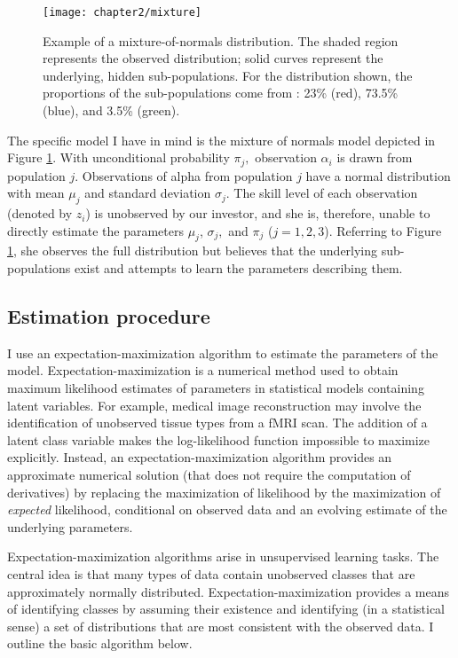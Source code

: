 		\begin{figure}[t]
			\small
			\centering
			\texttt{[image: chapter2/mixture]}
			\captionsetup{skip=-20pt, font=footnotesize, justification=justified, width=\textwidth}
			\caption[Example of a mixture-of-normals distribution]{Example of a mixture-of-normals distribution. The shaded region represents the observed distribution; solid curves represent the underlying, hidden sub-populations. For the distribution shown, the proportions of the sub-populations come from \citet{Barras2010}: 23\% (red), 73.5\% (blue), and 3.5\% (green).}
			\label{fig:mixture}
		\end{figure}

		The specific model I have in mind is the mixture of normals model depicted in Figure \ref{fig:mixture}. With unconditional probability $\pi_j,$ observation $\alpha_i$ is drawn from population $j$. Observations of alpha from population $j$ have a normal distribution with mean $\mu_j$ and standard deviation $\sigma_j$. The skill level of each observation (denoted by $z_i$) is unobserved by our investor, and she is, therefore, unable to directly estimate the parameters $\mu_j$, $\sigma_j,$ and $\pi_j$ ($j=1,2,3$). Referring to Figure \ref{fig:mixture}, she observes the full distribution but believes that the underlying sub-populations exist and attempts to learn the parameters describing them.

	\subsection{Estimation procedure}
		I use an expectation-maximization algorithm to estimate the parameters of the model. Expectation-maximization is a numerical method used to obtain maximum likelihood estimates of parameters in statistical models containing latent variables. For example, medical image reconstruction may involve the identification of unobserved tissue types from a fMRI scan.  The addition of a latent class variable makes the log-likelihood function impossible to maximize explicitly.  Instead, an expectation-maximization algorithm provides an approximate numerical solution (that does not require the computation of derivatives) by replacing the maximization of likelihood by the maximization of \textit{expected} likelihood, conditional on observed data and an evolving estimate of the underlying parameters.

		Expectation-maximization algorithms arise in unsupervised learning tasks.  The central idea is that many types of data contain unobserved classes that are approximately normally distributed.  Expectation-maximization provides a means of identifying classes by assuming their existence and identifying (in a statistical sense) a set of distributions that are most consistent with the observed data. I outline the basic algorithm below.

